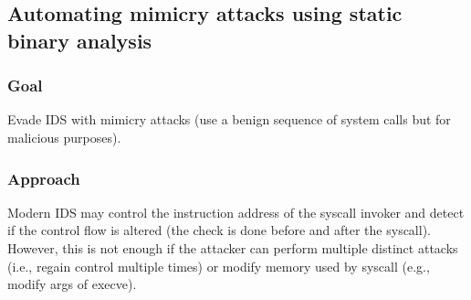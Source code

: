 \documentclass[10pt, a4paper]{article}
\begin{document}
\subsection{\cite{KKM-USEC05} Automating mimicry attacks using static binary analysis} 

\subsubsection{Goal}
Evade IDS with mimicry attacks (use a benign sequence of system calls but for malicious purposes).

\subsubsection{Approach}
Modern IDS may control the instruction address of the syscall invoker and detect if the control flow is altered (the check is done before and after the syscall). However, this is not enough if the attacker can perform multiple distinct attacks (i.e., regain control multiple times) or modify memory used by syscall (e.g., modify args of execve). \\
\end{document}
